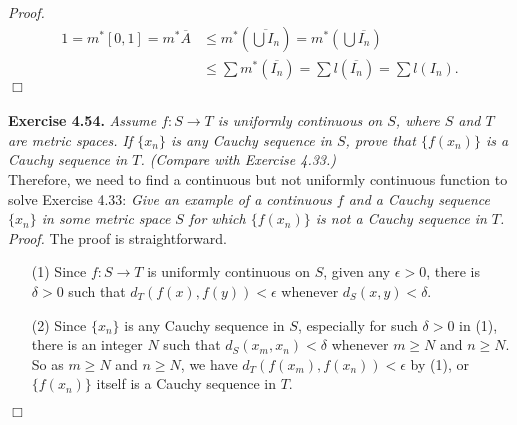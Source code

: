 \documentclass{article}
\begin{document}
\emph{Proof.}
\begin{align*}
1
= m^{*}[0, 1]
= m^{*}\overline{A}
&\leq m^{*}\left( \overline{\bigcup I_n} \right)
= m^{*}\left( \bigcup \overline{I_n} \right) \\
&\leq \sum m^{*}(\overline{I_n})
= \sum l(\overline{I_n})
= \sum l(I_n).
\end{align*}
$\Box$ \\\\



\textbf{Exercise 4.54.}
\emph{Assume $f: S \rightarrow T$ is uniformly continuous on $S$,
where $S$ and $T$ are metric spaces.
If $\{x_n\}$ is any Cauchy sequence in $S$,
prove that $\{f(x_n)\}$ is a Cauchy sequence in $T$.
(Compare with Exercise 4.33.)} \\

Therefore, we need to find a continuous but not uniformly continuous function
to solve Exercise 4.33:
\emph{Give an example of a continuous $f$ and a Cauchy sequence $\{x_n\}$
in some metric space $S$ for which $\{f(x_n)\}$ is not a Cauchy sequence in $T$.} \\

\emph{Proof.}
The proof is straightforward.
\begin{enumerate}
\item[(1)]
Since $f: S \rightarrow T$ is uniformly continuous on $S$,
given any $\epsilon > 0$, there is $\delta > 0$ such that
$d_T(f(x), f(y)) < \epsilon$ whenever $d_S(x, y) < \delta$.
\item[(2)]
Since $\{x_n\}$ is any Cauchy sequence in $S$,
especially for such $\delta > 0$ in (1), there is an integer $N$ such that
$d_S(x_m, x_n) < \delta$ whenever $m \geq N$ and $n \geq N$.
So as $m \geq N$ and $n \geq N$, we have
$d_T(f(x_m), f(x_n)) < \epsilon$ by (1),
or $\{f(x_n)\}$ itself is a Cauchy sequence in $T$.
\end{enumerate}
$\Box$ \\\\
\end{document}
